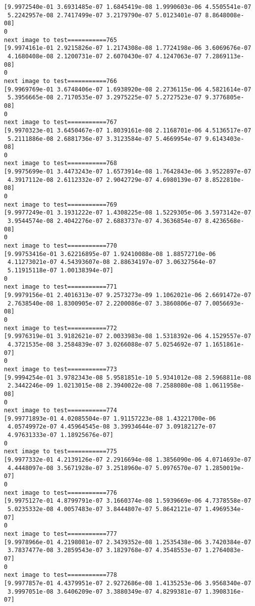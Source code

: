 \documentclass[11pt]{article}
\begin{document}
\begin{Verbatim}[commandchars=\\\{\}]
[9.9972540e-01 3.6931485e-07 1.6845419e-08 1.9990603e-06 4.5505541e-07
 5.2242957e-08 2.7417499e-07 3.2179790e-07 5.0123401e-07 8.8648008e-08]
0
next image to test===========765
[9.9974161e-01 2.9215826e-07 1.2174308e-08 1.7724198e-06 3.6069676e-07
 4.1680408e-08 2.1200731e-07 2.6070430e-07 4.1247063e-07 7.2869113e-08]
0
next image to test===========766
[9.9969769e-01 3.6748406e-07 1.6938920e-08 2.2736115e-06 4.5821614e-07
 5.3956665e-08 2.7170535e-07 3.2975225e-07 5.2727523e-07 9.3776805e-08]
0
next image to test===========767
[9.9970323e-01 3.6450467e-07 1.8039161e-08 2.1168701e-06 4.5136517e-07
 5.2111886e-08 2.6881736e-07 3.3123584e-07 5.4669954e-07 9.6143403e-08]
0
next image to test===========768
[9.9975699e-01 3.4473243e-07 1.6573914e-08 1.7642843e-06 3.9522897e-07
 4.3917112e-08 2.6112332e-07 2.9042729e-07 4.6980139e-07 8.8522810e-08]
0
next image to test===========769
[9.9977249e-01 3.1931222e-07 1.4308225e-08 1.5229305e-06 3.5973142e-07
 3.9544574e-08 2.4042276e-07 2.6883737e-07 4.3636854e-07 8.4236568e-08]
0
next image to test===========770
[9.99753416e-01 3.62216895e-07 1.92410088e-08 1.88572710e-06
 4.11273021e-07 4.54393607e-08 2.88634197e-07 3.06327564e-07
 5.11915118e-07 1.00138394e-07]
0
next image to test===========771
[9.9979156e-01 2.4016313e-07 9.2573273e-09 1.1062021e-06 2.6691472e-07
 2.7638540e-08 1.8300905e-07 2.2200086e-07 3.3860806e-07 7.0056693e-08]
0
next image to test===========772
[9.9976319e-01 3.9182621e-07 2.0033983e-08 1.5318392e-06 4.1529557e-07
 4.3721535e-08 3.2584839e-07 3.0266088e-07 5.0254692e-07 1.1651861e-07]
0
next image to test===========773
[9.9994254e-01 3.9782343e-08 5.9581851e-10 5.9341012e-08 2.5968811e-08
 2.3442246e-09 1.0213015e-08 2.3940022e-08 7.2588080e-08 1.0611958e-08]
0
next image to test===========774
[9.99771893e-01 4.02085504e-07 1.91157223e-08 1.43221700e-06
 4.05749972e-07 4.45964545e-08 3.39934644e-07 3.09182127e-07
 4.97631333e-07 1.18925676e-07]
0
next image to test===========775
[9.9977332e-01 4.2139126e-07 2.2916694e-08 1.3856090e-06 4.0714693e-07
 4.4448097e-08 3.5671928e-07 3.2518960e-07 5.0976570e-07 1.2850019e-07]
0
next image to test===========776
[9.9975127e-01 4.8799791e-07 3.1660374e-08 1.5939669e-06 4.7378558e-07
 5.0235332e-08 4.0057483e-07 3.8444807e-07 5.8642121e-07 1.4969534e-07]
0
next image to test===========777
[9.9978966e-01 4.2198081e-07 2.3439352e-08 1.2535438e-06 3.7420384e-07
 3.7837477e-08 3.2859543e-07 3.1829768e-07 4.3548553e-07 1.2764083e-07]
0
next image to test===========778
[9.9977857e-01 4.4379951e-07 2.9272686e-08 1.4135253e-06 3.9568340e-07
 3.9997051e-08 3.6406209e-07 3.3880349e-07 4.8299381e-07 1.3908316e-07]

\end{Verbatim}
\end{document}
